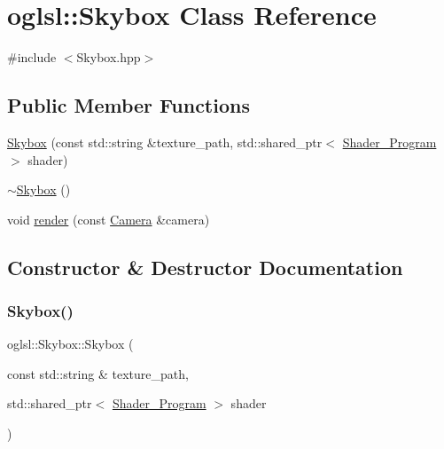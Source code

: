 \hypertarget{classoglsl_1_1_skybox}{}\section{oglsl\+:\+:Skybox Class Reference}
\label{classoglsl_1_1_skybox}


{\ttfamily \#include $<$Skybox.\+hpp$>$}

\subsection*{Public Member Functions}
\begin{DoxyCompactItemize}
\item 
\mbox{\hyperlink{classoglsl_1_1_skybox_a1fd7b807be900efc97e0e1ab2f0e0d1b}{Skybox}} (const std\+::string \&texture\+\_\+path, std\+::shared\+\_\+ptr$<$ \mbox{\hyperlink{classoglsl_1_1_shader___program}{Shader\+\_\+\+Program}} $>$ shader)
\item 
\mbox{\hyperlink{classoglsl_1_1_skybox_ae49b37d4211f0f6f3fb7de0199324a3f}{$\sim$\+Skybox}} ()
\item 
void \mbox{\hyperlink{classoglsl_1_1_skybox_a2ee558805867f1acdfab64f689c41f76}{render}} (const \mbox{\hyperlink{classoglsl_1_1_camera}{Camera}} \&camera)
\end{DoxyCompactItemize}


\subsection{Constructor \& Destructor Documentation}
\mbox{\label{classoglsl_1_1_skybox_a1fd7b807be900efc97e0e1ab2f0e0d1b}} 
\subsubsection{\texorpdfstring{Skybox()}{Skybox()}}
{\footnotesize\ttfamily oglsl\+::\+Skybox\+::\+Skybox (\begin{DoxyParamCaption}\item[{const std\+::string \&}]{texture\+\_\+path,  }\item[{std\+::shared\+\_\+ptr$<$ \mbox{\hyperlink{classoglsl_1_1_shader___program}{Shader\+\_\+\+Program}} $>$}]{shader }\end{DoxyParamCaption})}

